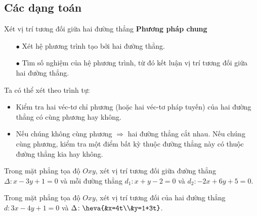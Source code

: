 \subsection{Các dạng toán}
	\begin{dang}{Xét vị trí tương đối giữa hai đường thẳng}
		\textbf{Phương pháp chung}
		\begin{itemize}
			\item [$\bullet$] Xét hệ phương trình tạo bởi hai đường thẳng.
			\item [$\bullet$] Tìm số nghiệm của hệ phương trình, từ đó kết luận vị trí tương đối giữa hai đường thẳng.
		\end{itemize}
	\begin{note}
		Ta có thể xét theo trình tự: \begin{itemize}
			\item Kiểm tra hai véc-tơ chỉ phương (hoặc hai véc-tơ pháp tuyến) của hai đường thẳng có cùng phương hay không.
			\item Nếu chúng không cùng phương $\Rightarrow $ hai đường thẳng cắt nhau. Nếu chúng cùng phương, kiểm tra một điểm bất kỳ thuộc đường thẳng này có thuộc đường thẳng kia hay không.
		\end{itemize}
	\end{note}
	\end{dang}
	\viduminhhoa
	\setcounter{vd}{0}
	\begin{vd}%
		Trong mặt phẳng tọa độ $Oxy$, xét vị trí tương đối giữa đường thẳng $\Delta \colon x-3y+1=0$ và mỗi đường thẳng $d_1 \colon x+y-2=0$ và $d_2 \colon -2x+6y+5=0$.
	\end{vd}
	\begin{vd}%
		Trong mặt phẳng tọa độ $Oxy$, xét vị trí tương đối của hai đường thẳng $d \colon 3x-4y+1=0$ và $\Delta \colon \heva{&x=4t\\&y=1+3t}$.
	\end{vd}
